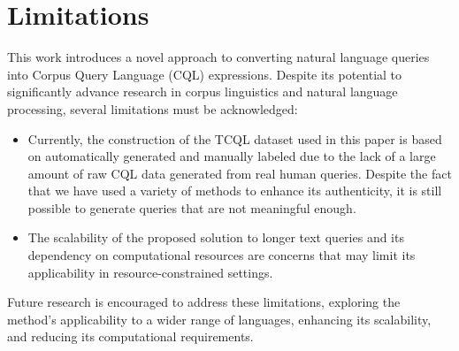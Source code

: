 \documentclass[11pt]{article}
\begin{document}
\begin{CJK*}{UTF8}{gbsn}
\label{sec:bibtex}

\section*{Limitations}
This work introduces a novel approach to converting natural language queries into Corpus Query Language (CQL) expressions. Despite its potential to significantly advance research in corpus linguistics and natural language processing, several limitations must be acknowledged:

\begin{itemize}
    \item Currently, the construction of the TCQL dataset used in this paper is based on automatically generated and manually labeled due to the lack of a large amount of raw CQL data generated from real human queries. Despite the fact that we have used a variety of methods to enhance its authenticity, it is still possible to generate queries that are not meaningful enough.
    \item The scalability of the proposed solution to longer text queries and its dependency on computational resources are concerns that may limit its applicability in resource-constrained settings.
\end{itemize}

Future research is encouraged to address these limitations, exploring the method's applicability to a wider range of languages, enhancing its scalability, and reducing its computational requirements.




\end{CJK*}
\end{document}
